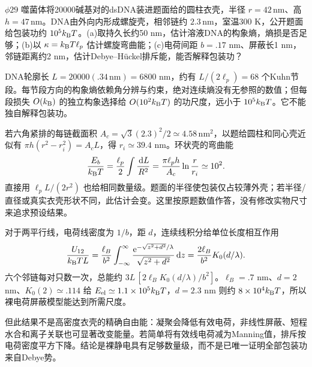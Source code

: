 \begin{exercise}
$\phi29$ 噬菌体将20000碱基对的dsDNA装进题面给的圆柱衣壳，半径 $r=42\,\mathrm{nm}$、高 $h=47\,\mathrm{nm}$。DNA由外向内形成螺旋壳，相邻链约 $2.3\,\mathrm{nm}$，室温300 K，公开题面给包装功约 $10^5k_{\mathrm B} T$。(a)取持久长约50 nm，估计溶液DNA的构象熵，熵损是否足够；(b)以 $\kappa=k_{\mathrm B} T\ell_p$ 估计螺旋弯曲能；(c)电荷间距 $b=.17$ nm、屏蔽长1 nm，邻链距离约2 nm，估计Debye--H\"uckel排斥能，能否解释包装功？
\end{exercise}
\begin{solution}
DNA轮廓长 $L=20000(.34\,\mathrm{nm})=6800$ nm，约有 $L/(2\ell_p)=68$ 个Kuhn节段。每节段方向的构象熵依赖角分辨与约束，绝对连续熵没有无参照的数值；但每段损失 $O(k_{\mathrm B})$ 的独立构象选择给 $O(10^2k_{\mathrm B} T)$ 的功尺度，远小于 $10^5k_{\mathrm B} T$。它不能独自解释包装功。

若六角紧排的每链截面积 $A_c=\sqrt3(2.3)^2/2\simeq4.58\,\mathrm{nm^2}$，以题给圆柱和同心壳近似有 $\pi h(r^2-r_i^2)=A_cL$，得 $r_i\simeq39.4$ nm。环状壳的弯曲能
\[
\frac{E_b}{k_{\mathrm B} T}=\frac{\ell_p}2\int\frac{\,\mathrm d L}{R^2}
=\frac{\pi\ell_ph}{A_c}\ln\frac r{r_i}\simeq10^2.
\]
直接用 $\ell_pL/(2r^2)$ 也给相同数量级。题面的半径使包装仅占较薄外壳；若半径/直径或真实衣壳形状不同，此估计会变。这里按原题数值作答，没有修改实物尺寸来追求预设结果。

对于两平行线，电荷线密度为 $1/b$，距 $d$，连续线积分给单位长度相互作用
\[
\frac{U_{12}}{k_{\mathrm B} TL}=\frac{\ell_B}{b^2}\int_{-\infty}^{\infty}
\frac{\mathrm e^{-\sqrt{z^2+d^2}/\lambda}}{\sqrt{z^2+d^2}}\,\mathrm d z
=\frac{2\ell_B}{b^2}K_0(d/\lambda).
\]
六个邻链每对只数一次，总能约 $3L\,[2\ell_BK_0(d/\lambda)/b^2]$。$\ell_B=.7$ nm、$d=2$ nm、$K_0(2)\simeq.114$ 给 $E_{\rm el}\simeq1.1\times10^5k_{\mathrm B} T$，$d=2.3$ nm 则约 $8\times10^4k_{\mathrm B} T$，所以裸电荷屏蔽模型能达到所需尺度。

但此结果不是高密度衣壳的精确自由能：凝聚会降低有效电荷，非线性屏蔽、短程水合和离子关联也可显著改变能量。若简单将有效线电荷减为Manning值，排斥按电荷密度平方下降。结论是裸静电具有足够数量级，而不是已唯一证明全部包装功来自Debye势。
\end{solution}


